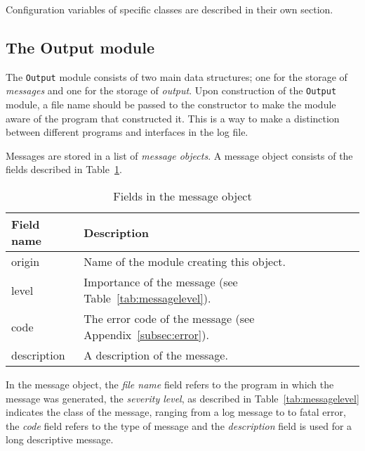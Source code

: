 \documentclass{article}
\begin{document}
Configuration variables of specific classes are described in their own section.

\subsection{The Output module} \label{subsec:output}
The \texttt{Output} module consists of two main data structures; one for the
storage of \emph{messages} and one for the storage of \emph{output}. Upon
construction of the \texttt{Output} module, a file name should be passed to
the constructor to make the module aware of the program that constructed it.
This is a way to make a distinction between different programs and interfaces
in the log file.

Messages are stored in a list of \emph{message objects}. A message object 
consists of the fields described in Table~\ref{tab:message}.

\begin{table}[H]
\begin{center}
\begin{tabular}{l|l}
Field name & Description \\
\hline
origin      & Name of the module creating this object. \\
level       & Importance of the message (see Table~\ref{tab:messagelevel}). \\
code        & The error code of the message 
              (see Appendix~\ref{subsec:error}). \\
description & A description of the message.
\end{tabular}
\caption{Fields in the message object} \label{tab:message}
\end{center}
\end{table}

In the message object, the \emph{file name} field refers to the program in
which the message was generated, the \emph{severity level}, as described in 
Table~\ref{tab:messagelevel} indicates the class of the message, ranging from a
log message to to fatal error, the \emph{code} field refers to the type of
message and the \emph{description} field is used for a long descriptive
message.
\end{document}
